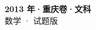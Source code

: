 \documentclass[zihao=-4, a4paper]{ctexart}
\begin{document}
\begin{center}
  {\Large\bfseries 2013 年·重庆卷·文科}\\[4pt]
  {\large 数学 · 试题版}
\end{center}
\medskip
{}

\end{document}
